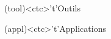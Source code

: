 \documentclass[../../main/main.tex]{subfiles}
\begin{document}
\begin{tcn}[%
		sidebyside, fontupper=\small, fontlower=\small
	]
	\begin{tcn}[nsp](tool)<ctc>'t'{Outils}
		\vspace{-25pt}
	\end{tcn}
	\begin{tcn}[nsp](appl)<ctc>'t'{Applications}
		\vspace{-25pt}
	\end{tcn}

\end{tcn}
\end{document}
